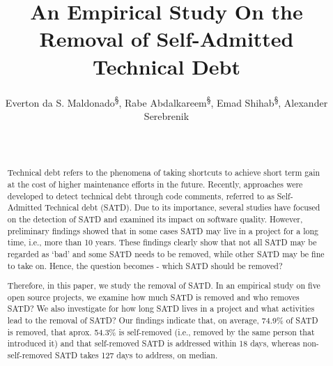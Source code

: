 \documentclass{sig-alternate}
\begin{document}







\title{An Empirical Study On the Removal of Self-Admitted Technical Debt}
\author{
	Everton da S. Maldonado\textsuperscript{\S}, Rabe Abdalkareem\textsuperscript{\S}, Emad Shihab\textsuperscript{\S}, Alexander Serebrenik\textsuperscript{\textdagger}\\
	\affaddr{}
	\\
	\\
}

\maketitle
\begin{abstract}
Technical debt refers to the phenomena of taking shortcuts to achieve short term gain at the cost of higher maintenance efforts in the future. Recently, approaches were developed to detect technical debt through code comments, referred to as Self-Admitted Technical debt (SATD). Due to its importance, several studies have focused on the detection of SATD and examined its impact on software quality. However, preliminary findings showed that in some cases SATD may live in a project for a long time, i.e., more than 10 years. These findings clearly show that not all SATD may be regarded as `bad' and some SATD needs to be removed, while other SATD may be fine to take on. Hence, the question becomes - which SATD should be removed?

Therefore, in this paper, we study the removal of SATD. In an empirical study on five open source projects, we examine how much SATD is removed and who removes SATD? We also investigate for how long SATD lives in a project and what activities lead to the removal of SATD? Our findings indicate that, on average, 74.9\% of SATD is removed, that aprox. 54.3\% is self-removed (i.e., removed by the same person that introduced it) and that self-removed SATD is addressed within 18 days, whereas non-self-removed SATD takes 127 days to address, on median.
\end{abstract}
\end{document}
